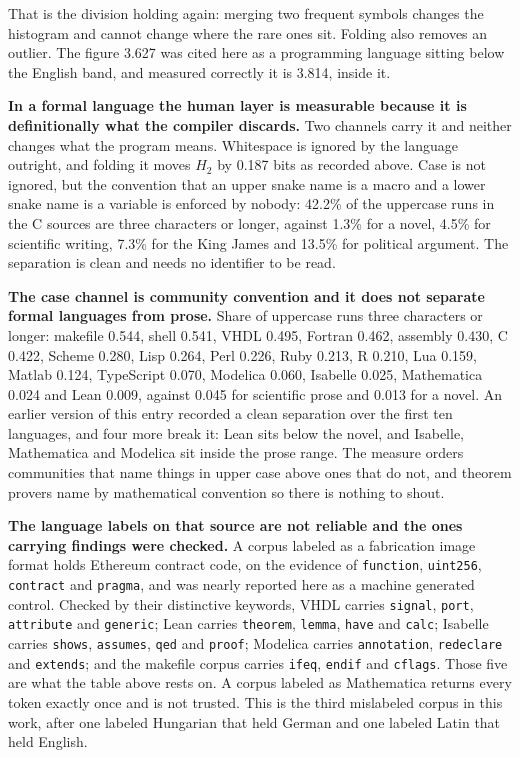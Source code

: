 That is the division holding again: merging two frequent symbols changes the histogram and cannot change where the rare ones sit. Folding also removes an outlier. The figure 3.627 was cited here as a programming language sitting below the English band, and measured correctly it is 3.814, inside it.

\textbf{In a formal language the human layer is measurable because it is definitionally what the compiler discards.} Two channels carry it and neither changes what the program means. Whitespace is ignored by the language outright, and folding it moves \(H_2\) by 0.187 bits as recorded above. Case is not ignored, but the convention that an upper snake name is a macro and a lower snake name is a variable is enforced by nobody: 42.2\% of the uppercase runs in the C sources are three characters or longer, against 1.3\% for a novel, 4.5\% for scientific writing, 7.3\% for the King James and 13.5\% for political argument. The separation is clean and needs no identifier to be read.

\textbf{The case channel is community convention and it does not separate formal languages from prose.} Share of uppercase runs three characters or longer: makefile 0.544, shell 0.541, VHDL 0.495, Fortran 0.462, assembly 0.430, C 0.422, Scheme 0.280, Lisp 0.264, Perl 0.226, Ruby 0.213, R 0.210, Lua 0.159, Matlab 0.124, TypeScript 0.070, Modelica 0.060, Isabelle 0.025, Mathematica 0.024 and Lean 0.009, against 0.045 for scientific prose and 0.013 for a novel. An earlier version of this entry recorded a clean separation over the first ten languages, and four more break it: Lean sits below the novel, and Isabelle, Mathematica and Modelica sit inside the prose range. The measure orders communities that name things in upper case above ones that do not, and theorem provers name by mathematical convention so there is nothing to shout.

\textbf{The language labels on that source are not reliable and the ones carrying findings were checked.} A corpus labeled as a fabrication image format holds Ethereum contract code, on the evidence of \texttt{function}, \texttt{uint256}, \texttt{contract} and \texttt{pragma}, and was nearly reported here as a machine generated control. Checked by their distinctive keywords, VHDL carries \texttt{signal}, \texttt{port}, \texttt{attribute} and \texttt{generic}; Lean carries \texttt{theorem}, \texttt{lemma}, \texttt{have} and \texttt{calc}; Isabelle carries \texttt{shows}, \texttt{assumes}, \texttt{qed} and \texttt{proof}; Modelica carries \texttt{annotation}, \texttt{redeclare} and \texttt{extends}; and the makefile corpus carries \texttt{ifeq}, \texttt{endif} and \texttt{cflags}. Those five are what the table above rests on. A corpus labeled as Mathematica returns every token exactly once and is not trusted. This is the third mislabeled corpus in this work, after one labeled Hungarian that held German and one labeled Latin that held English.

